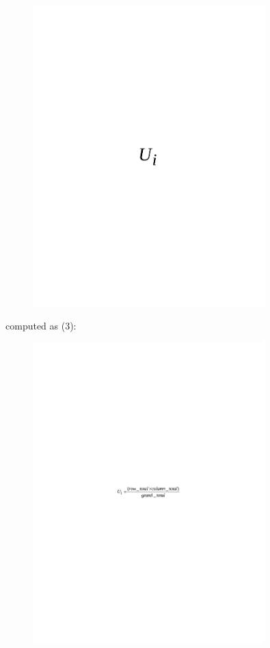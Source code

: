 \begin{figure}[H]
	\centering
	\includegraphics[width=0.8\textwidth]{media/ict/image36}
	\caption*{}
\end{figure}

computed as (3):

\begin{figure}[H]
	\centering
	\includegraphics[width=0.8\textwidth]{media/ict/image37}
	\caption*{}
\end{figure}


